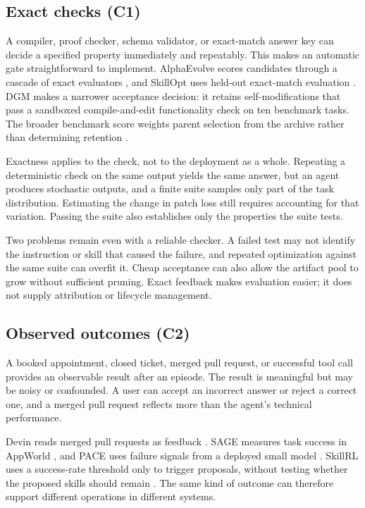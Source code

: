 \subsection{Exact checks (C1)}\label{exact-checks-c1}

A compiler, proof checker, schema validator, or exact-match answer key can decide a specified property immediately and repeatably. This makes an automatic gate straightforward to implement. AlphaEvolve scores candidates through a cascade of exact evaluators \citep{alphaevolve2025}, and SkillOpt uses held-out exact-match evaluation \citep{yang2026skillopt}. DGM makes a narrower acceptance decision: it retains self-modifications that pass a sandboxed compile-and-edit functionality check on ten benchmark tasks. The broader benchmark score weights parent selection from the archive rather than determining retention \citep{zhang2025darwin}.

Exactness applies to the check, not to the deployment as a whole. Repeating a deterministic check on the same output yields the same answer, but an agent produces stochastic outputs, and a finite suite samples only part of the task distribution. Estimating the change in patch loss still requires accounting for that variation. Passing the suite also establishes only the properties the suite tests.

Two problems remain even with a reliable checker. A failed test may not identify the instruction or skill that caused the failure, and repeated optimization against the same suite can overfit it. Cheap acceptance can also allow the artifact pool to grow without sufficient pruning. Exact feedback makes evaluation easier; it does not supply attribution or lifecycle management.

\subsection{Observed outcomes (C2)}\label{observed-outcomes-c2}

A booked appointment, closed ticket, merged pull request, or successful tool call provides an observable result after an episode. The result is meaningful but may be noisy or confounded. A user can accept an incorrect answer or reject a correct one, and a merged pull request reflects more than the agent's technical performance.

Devin reads merged pull requests as feedback \citep{cognition2025devinreview}. SAGE measures task success in AppWorld \citep{wang2025sage}, and PACE uses failure signals from a deployed small model \citep{ling2026pace}. SkillRL uses a success-rate threshold only to trigger proposals, without testing whether the proposed skills should remain \citep{skillrl2026}. The same kind of outcome can therefore support different operations in different systems.

